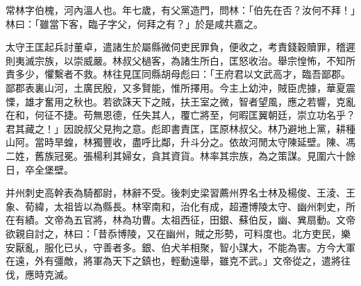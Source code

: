 \begin{pinyinscope}
 
 
 常林字伯槐，河內溫人也。年七歲，有父黨造門，問林：「伯先在否？汝何不拜！」林曰：「雖當下客，臨子字父，何拜之有？」於是咸共嘉之。
 
 
 太守王匡起兵討董卓，遣諸生於屬縣微伺吏民罪負，便收之，考責錢穀贖罪，稽遲則夷滅宗族，以崇威嚴。林叔父檛客，為諸生所白，匡怒收治。舉宗惶怖，不知所責多少，懼繫者不救。林往見匡同縣胡母彪曰：「王府君以文武高才，臨吾鄙郡。鄙郡表裏山河，土廣民殷，又多賢能，惟所擇用。今主上幼沖，賊臣虎據，華夏震慄，雄才奮用之秋也。若欲誅天下之賊，扶王室之微，智者望風，應之若響，克亂在和，何征不捷。苟無恩德，任失其人，覆亡將至，何暇匡翼朝廷，崇立功名乎？君其藏之！」因說叔父見拘之意。彪即書責匡，匡原林叔父。林乃避地上黨，耕種山阿。當時旱蝗，林獨豐收，盡呼比鄰，升斗分之。依故河閒太守陳延壁。陳、馮二姓，舊族冠冕。張楊利其婦女，貪其資貨。林率其宗族，為之策謀。見圍六十餘日，卒全堡壁。
 
 
 
 
 并州刺史高幹表為騎都尉，林辭不受。後刺史梁習薦州界名士林及楊俊、王淩、王象、荀緯，太祖皆以為縣長。林宰南和，治化有成，超遷博陵太守、幽州刺史，所在有績。文帝為五官將，林為功曹。太祖西征，田銀、蘇伯反，幽、兾扇動。文帝欲親自討之，林曰：「昔忝博陵，又在幽州，賊之形勢，可料度也。北方吏民，樂安厭亂，服化已乆，守善者多。銀、伯犬羊相聚，智小謀大，不能為害。方今大軍在遠，外有彊敵，將軍為天下之鎮也，輕動遠舉，雖克不武。」文帝從之，遣將往伐，應時克滅。
 

\end{pinyinscope}
